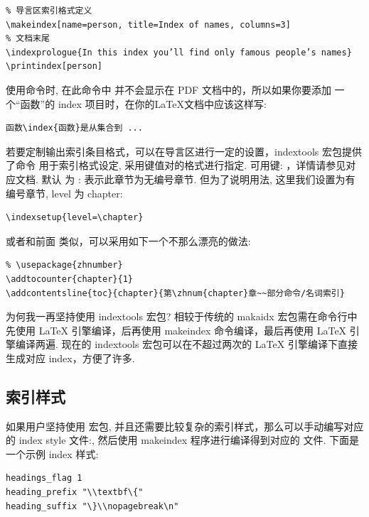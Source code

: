 \begin{verbatim}
% 导言区索引格式定义
\makeindex[name=person, title=Index of names, columns=3]
% 文档末尾
\indexprologue{In this index you’ll find only famous people’s names}
\printindex[person]
\end{verbatim}


使用命令时, 在此命令中  并不会显示在 PDF 文档中的，所以如果你要添加
一个``函数''的 index 项目时，在你的\LaTeX{}文档中应该这样写:

\begin{verbatim}
函数\index{函数}是从集合到 ...
\end{verbatim}

若要定制\cmd[F]{\printindex}输出索引条目格式，可以在导言区进行一定的设置，{indextools}
宏包提供了命令  用于索引格式设定, 采用键值对的格式进行指定. 可用键:
，详情请参见对应文档. 默认  为 :
表示此章节为无编号章节. 但为了说明用法, 这里我们设置为有编号章节, level 为 chapter:
\begin{verbatim}
\indexsetup{level=\chapter}
\end{verbatim}

或者和前面 \cmd{\printbibliography} 类似，可以采用如下一个不那么漂亮的做法:
\begin{verbatim}
% \usepackage{zhnumber}
\addtocounter{chapter}{1}
\addcontentsline{toc}{chapter}{第\zhnum{chapter}章~~部分命令/名词索引}
\end{verbatim}

为何我一再坚持使用 {indextools} 宏包? 相较于传统的 {makaidx} 宏包需在命令行中
先使用 \LaTeX{} 引擎编译，后再使用 {makeindex} 命令编译，最后再使用 \LaTeX{} 引擎编译两遍.
现在的 {indextools} 宏包可以在不超过两次的 \LaTeX{} 引擎编译下直接生成对应 index，方便了许多.

\subsection{索引样式}
如果用户坚持使用  宏包, 并且还需要比较复杂的索引样式，那么可以手动编写对应的 index style 
文件:, 然后使用 makeindex 程序进行编译得到对应的  文件. 下面是一个示例 index 样式:
\begin{verbatim}
headings_flag 1
heading_prefix "\\textbf\{"
heading_suffix "\}\\nopagebreak\n"
\end{verbatim}

